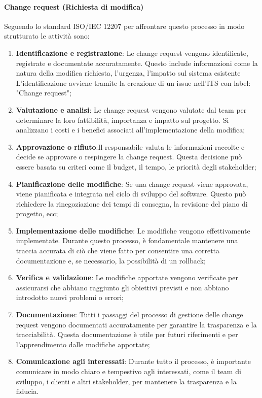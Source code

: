 \documentclass{article}
\begin{document}
\paragraph{Change request (Richiesta di modifica)}
Seguendo lo standard  ISO/IEC 12207 per affrontare questo processo in modo strutturato le attività sono:
\begin{enumerate}
    \item \textbf{Identificazione e registrazione}: Le change request vengono identificate, registrate e documentate accuratamente. Questo include informazioni come la natura della modifica richiesta, l'urgenza, l'impatto sul sistema esistente\\
          L'identificazione avviene tramite la creazione di un issue nell'ITS con label: "Change request";
    \item \textbf{Valutazione e analisi}: Le change request vengono valutate dal team per determinare la loro fattibilità, importanza e impatto sul progetto. Si analizzano i costi e i benefici associati all'implementazione della modifica;
    \item \textbf{Approvazione o rifiuto}:Il responsabile valuta le informazioni raccolte e decide se approvare o respingere la change request. Questa decisione può essere basata su criteri come il budget, il tempo, le priorità degli stakeholder;
    \item \textbf{Pianificazione delle modifiche}: Se una change request viene approvata, viene pianificata e integrata nel ciclo di sviluppo del software. Questo può richiedere la rinegoziazione dei tempi di consegna, la revisione del piano di progetto, ecc;
    \item \textbf{Implementazione delle modifiche}: Le modifiche vengono effettivamente implementate. Durante questo processo, è fondamentale mantenere una traccia accurata di ciò che viene fatto per consentire una corretta documentazione e, se necessario, la possibilità di un rollback;
    \item \textbf{Verifica e validazione}: Le modifiche apportate vengono verificate per assicurarsi che abbiano raggiunto gli obiettivi previsti e non abbiano introdotto nuovi problemi o errori;
    \item \textbf{Documentazione}: Tutti i passaggi del processo di gestione delle change request vengono documentati accuratamente per garantire la trasparenza e la tracciabilità. Questa documentazione è utile per futuri riferimenti e per l'apprendimento dalle modifiche apportate;
    \item \textbf{Comunicazione agli interessati}: Durante tutto il processo, è importante comunicare in modo chiaro e tempestivo agli interessati, come il team di sviluppo, i clienti e altri stakeholder, per mantenere la trasparenza e la fiducia.
\end{enumerate}
\end{document}
